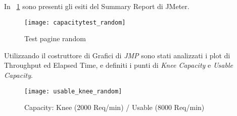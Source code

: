 In \figurename~\ref{random_page_summary_report} sono presenti gli esiti del
Summary Report di JMeter.\\

\begin{figure}[!htbp]
  \centering
  \texttt{[image: capacitytest\_random]}
  \caption{Test pagine random}
  \label{random_page_summary_report}
\end{figure}

Utilizzando il costruttore di Grafici di \textit{JMP} sono stati analizzati i plot
di Throughput ed Elapsed Time, e definiti i punti di \textit{Knee Capacity} e
\textit{Usable Capacity}.\\

\begin{figure}[!htbp]
  \centering
  \texttt{[image: usable\_knee\_random]}
  \caption{Capacity: Knee (2000 Req/min) / Usable (8000 Req/min)}
\end{figure}

